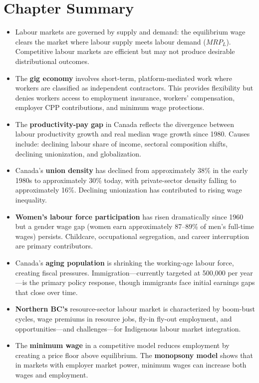 \section*{Chapter Summary}

\begin{itemize}
  \item Labour markets are governed by supply and demand: the equilibrium wage clears the market where labour supply meets labour demand ($MRP_L$). Competitive labour markets are efficient but may not produce desirable distributional outcomes.
  \item The \textbf{gig economy} involves short-term, platform-mediated work where workers are classified as independent contractors. This provides flexibility but denies workers access to employment insurance, workers' compensation, employer CPP contributions, and minimum wage protections.
  \item The \textbf{productivity-pay gap} in Canada reflects the divergence between labour productivity growth and real median wage growth since 1980. Causes include: declining labour share of income, sectoral composition shifts, declining unionization, and globalization.
  \item Canada's \textbf{union density} has declined from approximately 38\% in the early 1980s to approximately 30\% today, with private-sector density falling to approximately 16\%. Declining unionization has contributed to rising wage inequality.
  \item \textbf{Women's labour force participation} has risen dramatically since 1960 but a gender wage gap (women earn approximately 87--89\% of men's full-time wages) persists. Childcare, occupational segregation, and career interruption are primary contributors.
  \item Canada's \textbf{aging population} is shrinking the working-age labour force, creating fiscal pressures. Immigration---currently targeted at 500,000 per year---is the primary policy response, though immigrants face initial earnings gaps that close over time.
  \item \textbf{Northern BC's} resource-sector labour market is characterized by boom-bust cycles, wage premiums in resource jobs, fly-in fly-out employment, and opportunities---and challenges---for Indigenous labour market integration.
  \item The \textbf{minimum wage} in a competitive model reduces employment by creating a price floor above equilibrium. The \textbf{monopsony model} shows that in markets with employer market power, minimum wages can increase both wages and employment.

\end{itemize}
